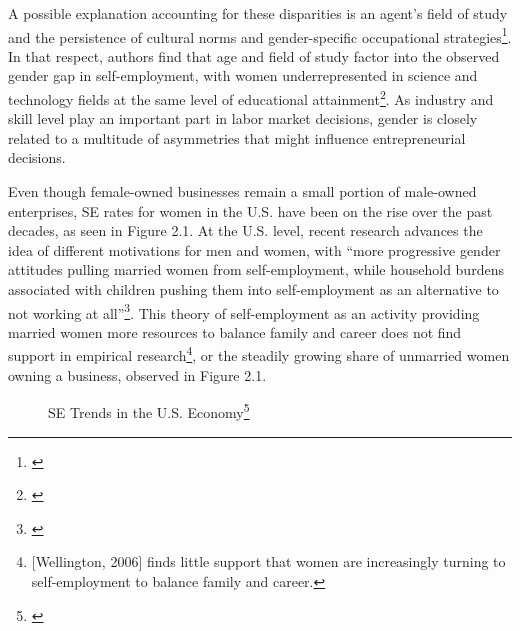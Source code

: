 A possible explanation accounting for these disparities is an agent's field of study and the persistence of cultural norms and gender-specific occupational strategies\footnote{\cite{CowlingTaylor2001}}. In that respect, authors find that age and field of study factor into the observed gender gap in self-employment, with women underrepresented in science and technology fields at the same level of educational attainment\footnote{\cite{GeorgellisWall2005}}. As industry and skill level play an important part in labor market decisions, gender is closely related to a multitude of asymmetries that might influence entrepreneurial decisions. 

Even though female-owned businesses remain a small portion of male-owned enterprises, SE rates for women in the U.S. have been on the rise over the past decades, as seen in Figure 2.1. At the U.S. level, recent research advances the idea of different motivations for men and women, with ``more progressive gender attitudes pulling married women from self-employment, while household burdens associated with children pushing them into self-employment as an alternative to not working at all''\footnote{\cite{PatrickStephensWeinstein2016}}. This theory of self-employment as an activity providing married women more resources to balance family and career does not find support in empirical research\footnote{[Wellington, 2006] finds little support that women are increasingly turning to self-employment to balance family and career.}, or the steadily growing share of unmarried women owning a business, observed in Figure 2.1.

\begin{figure}[hbtp]
    \caption{SE Trends in the U.S. Economy\footnote{\cite{PatrickStephensWeinstein2016}}} 
\end{figure}

